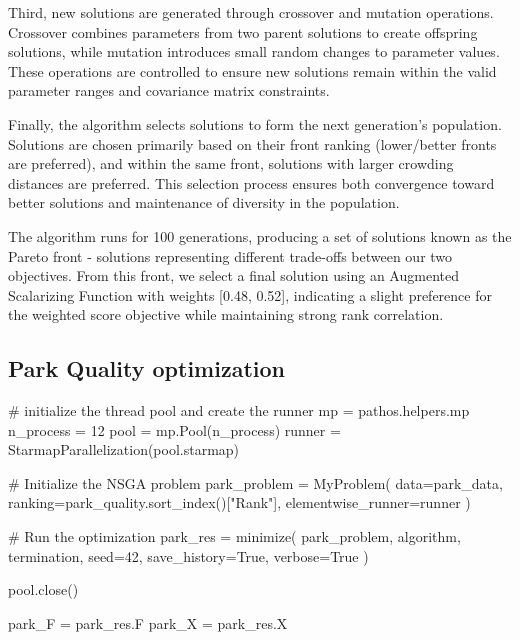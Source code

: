 \documentclass[
  authoryear,
  preprint,
  3p]{elsarticle}
\newenvironment{Shaded}{\begin{snugshade}}{\end{snugshade}}
\newcommand{\CommentTok}[1]{\textcolor[rgb]{0.37,0.37,0.37}{#1}}
\newcommand{\DecValTok}[1]{\textcolor[rgb]{0.68,0.00,0.00}{#1}}
\newcommand{\NormalTok}[1]{\textcolor[rgb]{0.00,0.23,0.31}{#1}}
\newcommand{\OperatorTok}[1]{\textcolor[rgb]{0.37,0.37,0.37}{#1}}
\newcommand{\StringTok}[1]{\textcolor[rgb]{0.13,0.47,0.30}{#1}}
\newcommand{\VariableTok}[1]{\textcolor[rgb]{0.07,0.07,0.07}{#1}}
\begin{document}
Third, new solutions are generated through crossover and mutation
operations. Crossover combines parameters from two parent solutions to
create offspring solutions, while mutation introduces small random
changes to parameter values. These operations are controlled to ensure
new solutions remain within the valid parameter ranges and covariance
matrix constraints.

Finally, the algorithm selects solutions to form the next generation's
population. Solutions are chosen primarily based on their front ranking
(lower/better fronts are preferred), and within the same front,
solutions with larger crowding distances are preferred. This selection
process ensures both convergence toward better solutions and maintenance
of diversity in the population.

The algorithm runs for 100 generations, producing a set of solutions
known as the Pareto front - solutions representing different trade-offs
between our two objectives. From this front, we select a final solution
using an Augmented Scalarizing Function with weights {[}0.48, 0.52{]},
indicating a slight preference for the weighted score objective while
maintaining strong rank correlation.

\subsection{Park Quality optimization}\label{park-quality-optimization}

\begin{Shaded}
\begin{Highlighting}[]
\CommentTok{\# initialize the thread pool and create the runner}
\NormalTok{mp }\OperatorTok{=}\NormalTok{ pathos.helpers.mp}
\NormalTok{n\_process }\OperatorTok{=} \DecValTok{12}
\NormalTok{pool }\OperatorTok{=}\NormalTok{ mp.Pool(n\_process)}
\NormalTok{runner }\OperatorTok{=}\NormalTok{ StarmapParallelization(pool.starmap)}

\CommentTok{\# Initialize the NSGA problem}
\NormalTok{park\_problem }\OperatorTok{=}\NormalTok{ MyProblem(}
\NormalTok{    data}\OperatorTok{=}\NormalTok{park\_data, ranking}\OperatorTok{=}\NormalTok{park\_quality.sort\_index()[}\StringTok{"Rank"}\NormalTok{], elementwise\_runner}\OperatorTok{=}\NormalTok{runner}
\NormalTok{)}

\CommentTok{\# Run the optimization}
\NormalTok{park\_res }\OperatorTok{=}\NormalTok{ minimize(}
\NormalTok{    park\_problem, algorithm, termination, seed}\OperatorTok{=}\DecValTok{42}\NormalTok{, save\_history}\OperatorTok{=}\VariableTok{True}\NormalTok{, verbose}\OperatorTok{=}\VariableTok{True}
\NormalTok{)}

\NormalTok{pool.close()}

\NormalTok{park\_F }\OperatorTok{=}\NormalTok{ park\_res.F}
\NormalTok{park\_X }\OperatorTok{=}\NormalTok{ park\_res.X}
\end{Highlighting}
\end{Shaded}
\end{document}
